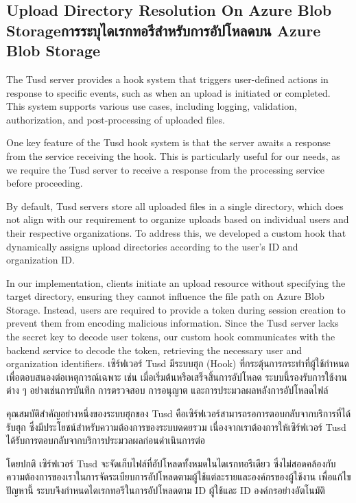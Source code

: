 \subsection{\ifenglish Upload Directory Resolution On Azure Blob Storage\else การระบุไดเรกทอรีสำหรับการอัปโหลดบน Azure Blob Storage\fi}

\ifenglish
The Tusd server provides a hook system that triggers user-defined actions in response to specific events, such as when an upload is initiated or completed. This system supports various use cases, including logging, validation, authorization, and post-processing of uploaded files.

One key feature of the Tusd hook system is that the server awaits a response from the service receiving the hook. This is particularly useful for our needs, as we require the Tusd server to receive a response from the processing service before proceeding.

By default, Tusd servers store all uploaded files in a single directory, which does not align with our requirement to organize uploads based on individual users and their respective organizations. To address this, we developed a custom hook that dynamically assigns upload directories according to the user's ID and organization ID.

In our implementation, clients initiate an upload resource without specifying the target directory, ensuring they cannot influence the file path on Azure Blob Storage. Instead, users are required to provide a token during session creation to prevent them from encoding malicious information. Since the Tusd server lacks the secret key to decode user tokens, our custom hook communicates with the backend service to decode the token, retrieving the necessary user and organization identifiers.
\else
เซิร์ฟเวอร์ Tusd มีระบบฮุก (Hook) ที่กระตุ้นการกระทำที่ผู้ใช้กำหนดเพื่อตอบสนองต่อเหตุการณ์เฉพาะ เช่น เมื่อเริ่มต้นหรือเสร็จสิ้นการอัปโหลด ระบบนี้รองรับการใช้งานต่าง ๆ อย่างเช่นการบันทึก การตรวจสอบ การอนุญาต และการประมวลผลหลังการอัปโหลดไฟล์

คุณสมบัติสำคัญอย่างหนึ่งของระบบฮุกของ Tusd คือเซิร์ฟเวอร์สามารถรอการตอบกลับจากบริการที่ได้รับฮุก ซึ่งมีประโยชน์สำหรับความต้องการของระบบดดยรวม เนื่องจากเราต้องการให้เซิร์ฟเวอร์ Tusd ได้รับการตอบกลับจากบริการประมวลผลก่อนดำเนินการต่อ

โดยปกติ เซิร์ฟเวอร์ Tusd จะจัดเก็บไฟล์ที่อัปโหลดทั้งหมดในไดเรกทอรีเดียว ซึ่งไม่สอดคล้องกับความต้องการของเราในการจัดระเบียบการอัปโหลดตามผู้ใช้แต่ละรายและองค์กรของผู้ใช้งาน เพื่อแก้ไขปัญหานี้ ระบบจึงกำหนดไดเรกทอรีในการอัปโหลดตาม ID ผู้ใช้และ ID องค์กรอย่างอัตโนมัติ

